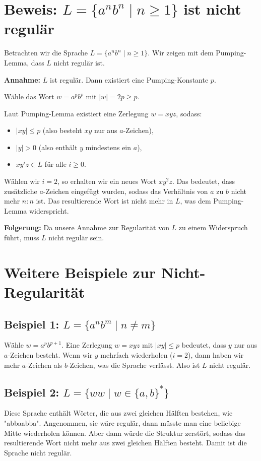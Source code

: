 \documentclass{article}
\begin{document}
	\section{Beweis: $L = \{a^n b^n \mid n \geq 1\}$ ist nicht regulär}
	Betrachten wir die Sprache $L = \{a^n b^n \mid n \geq 1\}$. Wir zeigen mit dem Pumping-Lemma, dass $L$ nicht regulär ist.
	
	\textbf{Annahme:} $L$ ist regulär. Dann existiert eine Pumping-Konstante $p$.
	
	Wähle das Wort $w = a^p b^p$ mit $|w| = 2p \geq p$.
	
	Laut Pumping-Lemma existiert eine Zerlegung $w = xyz$, sodass:
	
	\begin{itemize}
		\item $|xy| \leq p$ (also besteht $xy$ nur aus $a$-Zeichen),
		\item $|y| > 0$ (also enthält $y$ mindestens ein $a$),
		\item $xy^i z \in L$ für alle $i \geq 0$.
	\end{itemize}
	
	Wählen wir $i = 2$, so erhalten wir ein neues Wort $xy^2z$. Das bedeutet, dass zusätzliche $a$-Zeichen eingefügt wurden, sodass das Verhältnis von $a$ zu $b$ nicht mehr $n:n$ ist. Das resultierende Wort ist nicht mehr in $L$, was dem Pumping-Lemma widerspricht.
	
	\textbf{Folgerung:} Da unsere Annahme zur Regularität von $L$ zu einem Widerspruch führt, muss $L$ nicht regulär sein.
	
	\section{Weitere Beispiele zur Nicht-Regularität}
	\subsection{Beispiel 1: $L = \{a^n b^m \mid n \neq m\}$}
	Wähle $w = a^p b^{p+1}$. Eine Zerlegung $w = xyz$ mit $|xy| \leq p$ bedeutet, dass $y$ nur aus $a$-Zeichen besteht. Wenn wir $y$ mehrfach wiederholen ($i=2$), dann haben wir mehr $a$-Zeichen als $b$-Zeichen, was die Sprache verlässt. Also ist $L$ nicht regulär.
	
	\subsection{Beispiel 2: $L = \{ww \mid w \in \{a,b\}^* \}$}
	Diese Sprache enthält Wörter, die aus zwei gleichen Hälften bestehen, wie "abbaabba". Angenommen, sie wäre regulär, dann müsste man eine beliebige Mitte wiederholen können. Aber dann würde die Struktur zerstört, sodass das resultierende Wort nicht mehr aus zwei gleichen Hälften besteht. Damit ist die Sprache nicht regulär.
	
\end{document}
